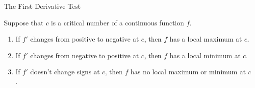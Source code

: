 \begin{frame}
The First Derivative Test

Suppose that $c$ is a critical number of a continuous function $f$.
\begin{enumerate}
\item<1-| alert@2>  \alert<handout:1| 0>{If $f'$ changes from positive to negative at $c$, then $f$ has a local maximum at $c$.}
\item<1-| alert@3>  \alert<handout:2| 0>{If $f'$ changes from negative to positive at $c$, then $f$ has a local minimum at $c$.}
\item<1-| alert@4>  \alert<handout:3| 0>{If $f'$ doesn't change signs at $c$, then $f$ has no local maximum or minimum at $c$.}
\end{enumerate}
\begin{columns}[c]
\ %
%
%
%
\end{columns}
\end{frame}
